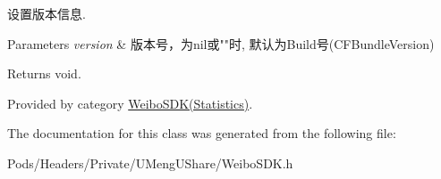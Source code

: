 设置版本信息. 
\begin{DoxyParams}{Parameters}
{\em version} & 版本号，为nil或""时, 默认为\+Build号(\+C\+F\+Bundle\+Version) \\
\hline
\end{DoxyParams}
\begin{DoxyReturn}{Returns}
void. 
\end{DoxyReturn}


Provided by category \mbox{\hyperlink{category_weibo_s_d_k_07_statistics_08_ac68e6c65a10fa6c5f04c1293050a7127}{Weibo\+S\+D\+K(\+Statistics)}}.



The documentation for this class was generated from the following file\+:\begin{DoxyCompactItemize}
\item 
Pods/\+Headers/\+Private/\+U\+Meng\+U\+Share/Weibo\+S\+D\+K.\+h\end{DoxyCompactItemize}
